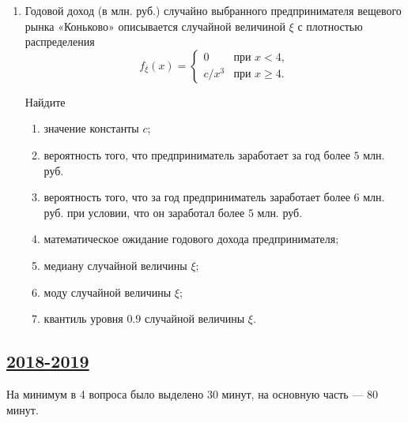\begin{enumerate}
  \item Годовой доход (в млн. руб.) случайно выбранного предпринимателя вещевого рынка «Коньково» описывается случайной величиной $\xi$ с плотностью распределения
  \[
  f_{\xi}(x) =      \begin{cases}
                       0           &   \text{при } x < 4, \\
                       c / x^3     &   \text{при } x \geq 4.
                    \end{cases}
  \]
  
  Найдите
  \begin{enumerate}
      \item значение константы $c$;
      \item вероятность того, что предприниматель заработает за год более $5$ млн. руб.
      \item вероятность того, что за год предприниматель заработает более $6$ млн. руб. при условии, что он заработал более $5$ млн. руб.
      \item математическое ожидание годового дохода предпринимателя;
      \item медиану случайной величины $\xi$;
      \item моду случайной величины $\xi$;
      \item квантиль уровня $0.9$ случайной величины $\xi$.
  \end{enumerate}
  \end{enumerate}
  



\subsection[2018-2019]{\hyperref[sec:sol_kr_01_2018_2019]{2018-2019}}
\label{sec:kr_01_2018_2019} %

На минимум в 4 вопроса было выделено 30 минут, на основную часть — 80 минут.

